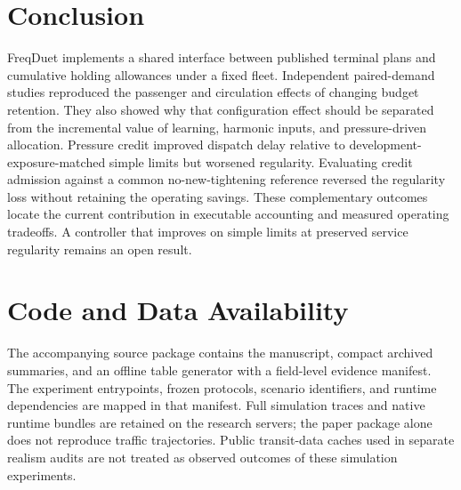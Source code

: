 \documentclass[letterpaper,journal]{IEEEtran}
\begin{document}
\section{Conclusion}
FreqDuet implements a shared interface between published terminal plans and cumulative holding allowances under a fixed fleet. Independent paired-demand studies reproduced the passenger and circulation effects of changing budget retention. They also showed why that configuration effect should be separated from the incremental value of learning, harmonic inputs, and pressure-driven allocation. Pressure credit improved dispatch delay relative to development-exposure-matched simple limits but worsened regularity. Evaluating credit admission against a common no-new-tightening reference reversed the regularity loss without retaining the operating savings. These complementary outcomes locate the current contribution in executable accounting and measured operating tradeoffs. A controller that improves on simple limits at preserved service regularity remains an open result.
\section*{Code and Data Availability}
The accompanying source package contains the manuscript, compact archived summaries, and an offline table generator with a field-level evidence manifest. The experiment entrypoints, frozen protocols, scenario identifiers, and runtime dependencies are mapped in that manifest. Full simulation traces and native runtime bundles are retained on the research servers; the paper package alone does not reproduce traffic trajectories. Public transit-data caches used in separate realism audits are not treated as observed outcomes of these simulation experiments.
\clearpage
\appendices



\end{document}
